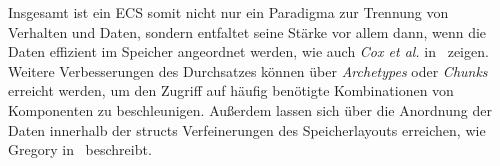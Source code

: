 Insgesamt ist ein ECS somit nicht nur ein Paradigma zur Trennung von Verhalten und Daten, sondern entfaltet seine Stärke vor allem dann, wenn die Daten effizient im Speicher angeordnet werden, wie auch \textit{Cox et al.} in~\cite{CWVW+25} zeigen.\\

Weitere Verbesserungen des Durchsatzes können über \textit{Archetypes} oder \textit{Chunks}~\cite{UnityChunks} erreicht werden, um den Zugriff auf häufig benötigte Kombinationen von Komponenten zu beschleunigen.
Außerdem lassen sich über die Anordnung der Daten innerhalb der structs Verfeinerungen des Speicherlayouts erreichen, wie Gregory in~\cite[S. 159-161]{Gre19} beschreibt.